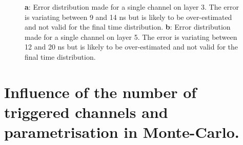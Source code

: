 \begin{figure}[htbp]
	\hfill
	\caption[]{\textbf{a}: Error distribution made for a single channel on layer 3. The error is variating between 9 and 14 ns but is likely to be over-estimated and not valid for the final time distribution. \textbf{b}: Error distribution made for a single channel on layer 5. The error is variating between 12 and 20 ns but is likely to be over-estimated and not valid for the final time distribution.}
	\label{fig:error_calibration}
\end{figure}

\newpage
\section{Influence of the number of triggered channels and parametrisation in Monte-Carlo.}
\label{appendix:ped_shift}

